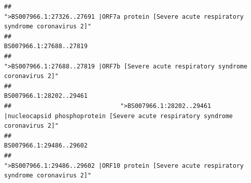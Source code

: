 \documentclass[
]{article}
\begin{document}
\begin{verbatim}
##                                            ">BS007966.1:27326..27691 |ORF7a protein [Severe acute respiratory syndrome coronavirus 2]" 
##                                                                                                                BS007966.1:27688..27819 
##                                                    ">BS007966.1:27688..27819 |ORF7b [Severe acute respiratory syndrome coronavirus 2]" 
##                                                                                                                BS007966.1:28202..29461 
##                              ">BS007966.1:28202..29461 |nucleocapsid phosphoprotein [Severe acute respiratory syndrome coronavirus 2]" 
##                                                                                                                BS007966.1:29486..29602 
##                                            ">BS007966.1:29486..29602 |ORF10 protein [Severe acute respiratory syndrome coronavirus 2]"
\end{verbatim}
\end{document}
